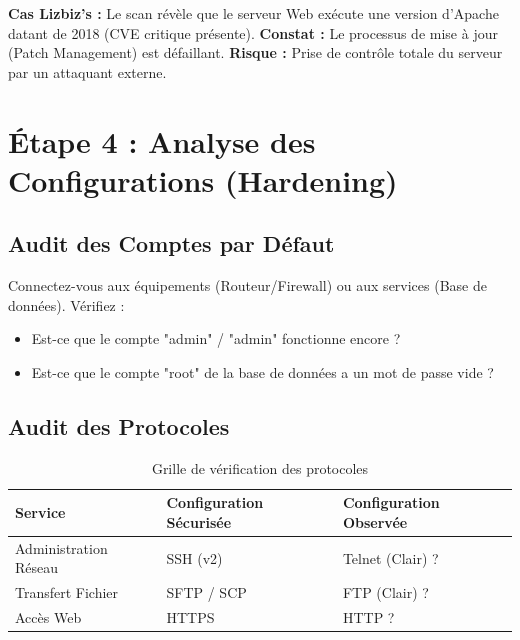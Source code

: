 \begin{boxlizbiz}
\textbf{Cas Lizbiz's :}
Le scan révèle que le serveur Web exécute une version d'Apache datant de 2018 (CVE critique présente).
\textbf{Constat :} Le processus de mise à jour (Patch Management) est défaillant.
\textbf{Risque :} Prise de contrôle totale du serveur par un attaquant externe.
\end{boxlizbiz}

\section{Étape 4 : Analyse des Configurations (Hardening)}

\subsection{Audit des Comptes par Défaut}

Connectez-vous aux équipements (Routeur/Firewall) ou aux services (Base de données).
Vérifiez :
\begin{itemize}
    \item Est-ce que le compte "admin" / "admin" fonctionne encore ?
    \item Est-ce que le compte "root" de la base de données a un mot de passe vide ?
\end{itemize}

\subsection{Audit des Protocoles}

\begin{table}[h!]
\centering
\begin{tabular}{p{4cm}p{4cm}p{4cm}}
    \toprule
    \textbf{Service} & \textbf{Configuration Sécurisée} & \textbf{Configuration Observée} \\
    \midrule
    Administration Réseau & SSH (v2) & Telnet (Clair) ? \\
    Transfert Fichier & SFTP / SCP & FTP (Clair) ? \\
    Accès Web & HTTPS & HTTP ? \\
    \bottomrule
\end{tabular}
\caption{Grille de vérification des protocoles}
\end{table}

